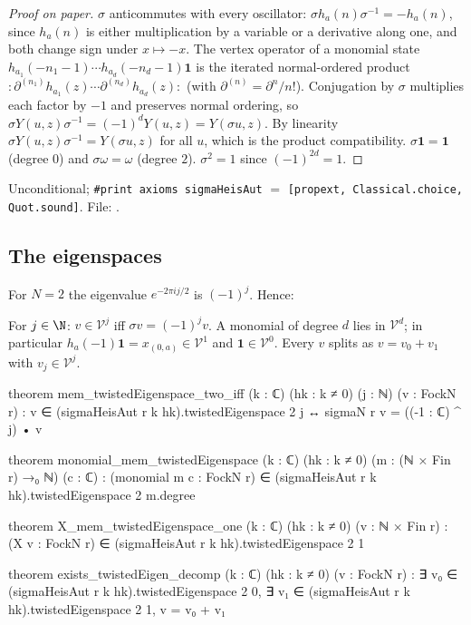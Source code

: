 \begin{proof}[Proof on paper]
$\sigma$ anticommutes with every oscillator: $\sigma h_a(n)\sigma^{-1} = -h_a(n)$, since
$h_a(n)$ is either multiplication by a variable or a derivative along one, and both change sign
under $x\mapsto -x$. The vertex operator of a monomial state $h_{a_1}(-n_1-1)\cdots
h_{a_d}(-n_d-1)\mathbf 1$ is the iterated normal-ordered product
${:}\partial^{(n_1)}h_{a_1}(z)\cdots\partial^{(n_d)}h_{a_d}(z){:}$ (with
$\partial^{(n)} = \partial^n/n!$). Conjugation by $\sigma$ multiplies each factor by $-1$ and
preserves normal ordering, so $\sigma Y(u,z)\sigma^{-1} = (-1)^dY(u,z) = Y(\sigma u,z)$. By
linearity $\sigma Y(u,z)\sigma^{-1} = Y(\sigma u, z)$ for all $u$, which is the product
compatibility. $\sigma\mathbf1=\mathbf1$ (degree $0$) and $\sigma\omega = \omega$ (degree $2$).
$\sigma^2=1$ since $(-1)^{2d}=1$.
\end{proof}

\begin{status}
Unconditional; \verb|#print axioms sigmaHeisAut| $=$ \texttt{[propext, Classical.choice,
Quot.sound]}. File: .
\end{status}

\subsection{The eigenspaces}

For $N=2$ the eigenvalue $e^{-2\pi ij/2}$ is $(-1)^j$. Hence:

\begin{proposition}\label{ch07:prop:eigen}
For $j\in\N$: $v\in\mathcal V^j$ iff $\sigma v = (-1)^jv$. A monomial of degree $d$ lies in
$\mathcal V^d$; in particular $h_a(-1)\mathbf 1 = x_{(0,a)}\in\mathcal V^1$ and
$\mathbf 1\in\mathcal V^0$. Every $v$ splits as $v = v_0+v_1$ with $v_j\in\mathcal V^j$.
\end{proposition}

\begin{leancode}
theorem mem_twistedEigenspace_two_iff (k : ℂ) (hk : k ≠ 0) (j : ℕ) (v : FockN r) :
    v ∈ (sigmaHeisAut r k hk).twistedEigenspace 2 j ↔ sigmaN r v = ((-1 : ℂ) ^ j) • v

theorem monomial_mem_twistedEigenspace (k : ℂ) (hk : k ≠ 0) (m : (ℕ × Fin r) →₀ ℕ) (c : ℂ) :
    (monomial m c : FockN r) ∈ (sigmaHeisAut r k hk).twistedEigenspace 2 m.degree

theorem X_mem_twistedEigenspace_one (k : ℂ) (hk : k ≠ 0) (v : ℕ × Fin r) :
    (X v : FockN r) ∈ (sigmaHeisAut r k hk).twistedEigenspace 2 1

theorem exists_twistedEigen_decomp (k : ℂ) (hk : k ≠ 0) (v : FockN r) :
    ∃ v₀ ∈ (sigmaHeisAut r k hk).twistedEigenspace 2 0,
      ∃ v₁ ∈ (sigmaHeisAut r k hk).twistedEigenspace 2 1, v = v₀ + v₁
\end{leancode}

